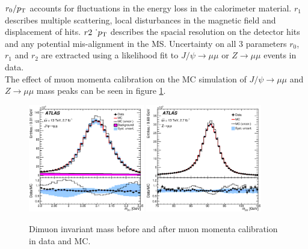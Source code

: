 \indent $r_0/p_{\mathrm{T}}$ accounts for fluctuations in the energy loss in the calorimeter material.  $r_1$ describes multiple scattering, local disturbances in the magnetic field and displacement of hits.  $r2~\dot~p_{\mathrm{T}}$ describes the spacial resolution on the detector hits and any potential mis-alignment in the MS.  Uncertainty on all 3 parameters $r_0$, $r_1$ and $r_2$ are extracted using a likelihood fit to $J/\psi\rightarrow \mu\mu$ or $Z\rightarrow\mu\mu$ events in data. \\

The effect of muon momenta calibration on the MC simulation of $J/\psi\rightarrow \mu\mu$ and $Z\rightarrow\mu\mu$ mass peaks can be seen in figure \ref{fig:muonCalib}. \\

\begin{figure}[htb]
  \begin{center}
    \includegraphics[width=0.45\textwidth]{figures/MuonReco/JPsiMass.eps}\hspace{0.05\textwidth}
    \includegraphics[width=0.45\textwidth]{figures/MuonReco/ZMass.eps}\hspace{0.05\textwidth}
\end{center}
\caption{Dimuon invariant mass before and after muon momenta calibration in data and MC.\cite{MuonReco}}
\label{fig:muonCalib} 
\end{figure}